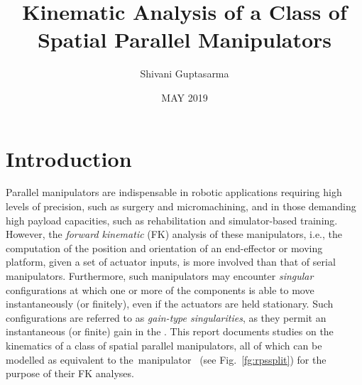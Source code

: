 \documentclass[DD,synopsis]{iitmdiss}
\title{Kinematic Analysis of a Class of Spatial Parallel Manipulators}
\author{Shivani Guptasarma}
\date{MAY 2019}
\begin{document}
\maketitle



\setcounter{page}{0}
\section{Introduction}
Parallel manipulators are indispensable in robotic applications requiring high levels of precision, such as surgery and micromachining, and in those demanding high payload capacities, such as rehabilitation and simulator-based training. However, the \emph{forward kinematic} (FK) analysis of these manipulators, i.e., the computation of the position and orientation of an end-effector or moving platform, given a set of actuator inputs, is more involved than that of serial manipulators. Furthermore, such manipulators may encounter \emph{singular} configurations at which one or more of the components is able to move instantaneously (or finitely), even if the actuators are held stationary. Such configurations are referred to as \emph{gain-type singularities}, as they permit an instantaneous (or finite) gain in the \emph{\dof}. This report documents studies on the kinematics of a class of spatial parallel manipulators, all of which can be modelled as equivalent to the~\rps manipulator~\cite{hunt1993} (see Fig.~\ref{fg:rpssplit}) for the purpose of their FK analyses.
\end{document}
